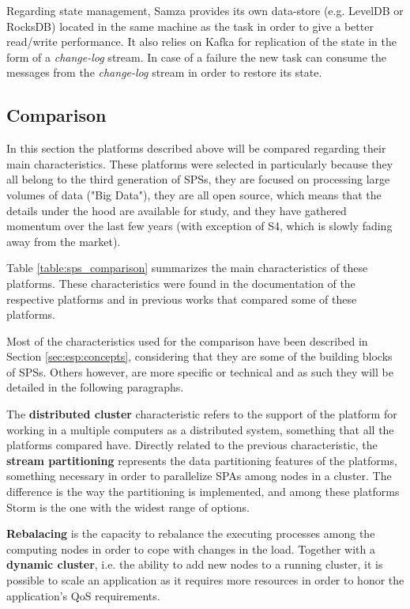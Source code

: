 \documentclass[ppgc,diss,english]{iiufrgs}
\begin{document}
Regarding state management, Samza provides its own data-store (e.g. LevelDB or RocksDB) located in the same machine as the task in order to give a better read/write performance. It also relies on Kafka for replication of the state in the form of a \emph{change-log} stream. In case of a failure the new task can consume the messages from the \emph{change-log} stream in order to restore its state.

\subsection{Comparison}

In this section the platforms described above will be compared regarding their main characteristics. These platforms were selected in particularly because they all belong to the third generation of SPSs, they are focused on processing large volumes of data ("Big Data"), they are all open source, which means that the details under the hood are available for study, and they have gathered momentum over the last few years (with exception of S4, which is slowly fading away from the market).

Table \ref{table:sps_comparison} summarizes the main characteristics of these platforms. These characteristics were found in the documentation of the respective platforms and in previous works \cite{bockermann2014survey, gradvohl2014comparing, kamburugamuvesurvey} that compared some of these platforms.

Most of the characteristics used for the comparison have been described in Section \ref{sec:esp:concepts}, considering that they are some of the building blocks of SPSs. Others however, are more specific or technical and as such they will be detailed in the following paragraphs.

The \textbf{distributed cluster} characteristic refers to the support of the platform for working in a multiple computers as a distributed system, something that all the platforms compared have. Directly related to the previous characteristic, the \textbf{stream partitioning} represents the data partitioning features of the platforms, something necessary in order to parallelize SPAs among nodes in a cluster. The difference is the way the partitioning is implemented, and among these platforms Storm is the one with the widest range of options.

\textbf{Rebalacing} is the capacity to rebalance the executing processes among the computing nodes in order to cope with changes in the load. Together with a \textbf{dynamic cluster}, i.e. the ability to add new nodes to a running cluster, it is possible to scale an application as it requires more resources in order to honor the application's QoS requirements.
\end{document}
